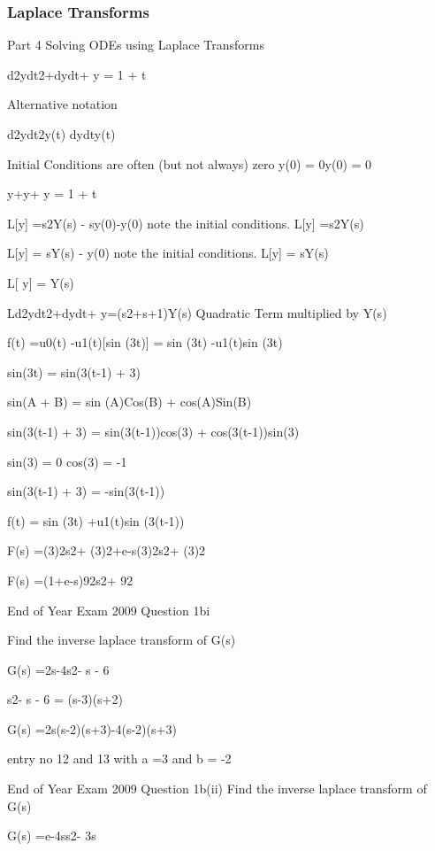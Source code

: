 \begin{frame}
\frametitle{Laplace Transforms}
\Large
Part 4 Solving ODEs using Laplace Transforms 
 
d2ydt2+dydt+ y = 1 + t 
 
Alternative notation
 
d2ydt2y(t)				dydty(t)

Initial Conditions are often (but not always) zero	y(0) = 0y(0) = 0
 
 
y+y+ y = 1 + t
 
L[y] =s2Y(s) - sy(0)-y(0)            note the initial conditions. L[y] =s2Y(s)
 
L[y] = sY(s) - y(0)                           note the initial conditions. L[y] = sY(s) 
 
L[ y] = Y(s)
 
Ld2ydt2+dydt+ y=(s2+s+1)Y(s)	Quadratic Term multiplied by Y(s)


 


f(t) =u0(t) -u1(t)[sin (3t)] = sin (3t) -u1(t)sin (3t)

sin(3t) = sin(3(t-1) + 3)

sin(A + B) = sin (A)Cos(B) + cos(A)Sin(B) 

sin(3(t-1) + 3) = sin(3(t-1))cos(3) + cos(3(t-1))sin(3)

sin(3) = 0	           cos(3) = -1

sin(3(t-1) + 3) = -sin(3(t-1))

f(t) = sin (3t) +u1(t)sin (3(t-1))

F(s) =(3)2s2+ (3)2+e-s(3)2s2+ (3)2

F(s) =(1+e-s)92s2+ 92

End of Year Exam  2009 Question 1bi

Find the inverse laplace transform of G(s)

G(s) =2s-4s2- s - 6

s2- s - 6 = (s-3)(s+2)

G(s) =2s(s-2)(s+3)-4(s-2)(s+3)

entry no 12 and 13 with a =3 and b =  -2


End of Year Exam  2009 Question 1b(ii)
Find the inverse laplace transform of G(s)

G(s) =e-4ss2- 3s



\end{frame}
